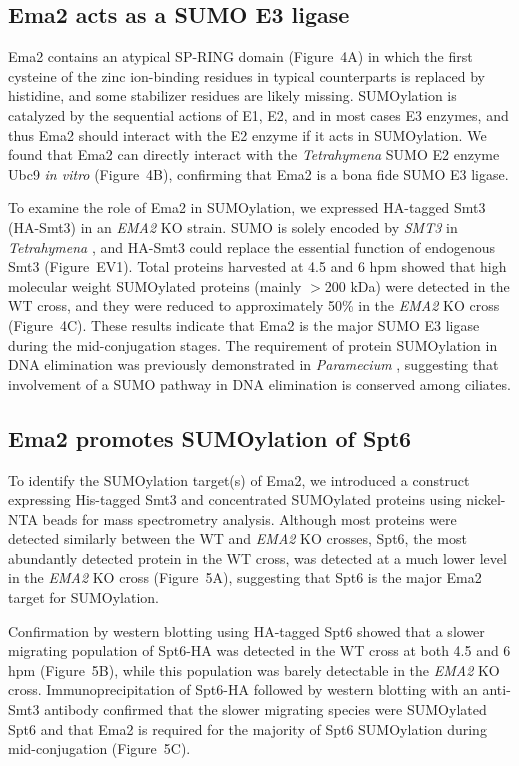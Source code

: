 \documentclass[11pt]{article}
\begin{document}
\subsection{Ema2 acts as a SUMO E3 ligase}

Ema2 contains an atypical SP-RING domain (Figure~4A) in which the first cysteine of the zinc ion-binding residues in typical counterparts is replaced by histidine, and some stabilizer residues \citep{duan2009,yunus2009} are likely missing. SUMOylation is catalyzed by the sequential actions of E1, E2, and in most cases E3 enzymes, and thus Ema2 should interact with the E2 enzyme if it acts in SUMOylation. We found that Ema2 can directly interact with the \textit{Tetrahymena} SUMO E2 enzyme Ubc9 \textit{in vitro} (Figure~4B), confirming that Ema2 is a bona fide SUMO E3 ligase.

To examine the role of Ema2 in SUMOylation, we expressed HA-tagged Smt3 (HA-Smt3) in an \textit{EMA2} KO strain. SUMO is solely encoded by \textit{SMT3} in \textit{Tetrahymena} \citep{nasir2015}, and HA-Smt3 could replace the essential function of endogenous Smt3 (Figure~EV1). Total proteins harvested at 4.5 and 6 hpm showed that high molecular weight SUMOylated proteins (mainly $>$200 kDa) were detected in the WT cross, and they were reduced to approximately 50\% in the \textit{EMA2} KO cross (Figure~4C). These results indicate that Ema2 is the major SUMO E3 ligase during the mid-conjugation stages. The requirement of protein SUMOylation in DNA elimination was previously demonstrated in \textit{Paramecium} \citep{matsuda2006}, suggesting that involvement of a SUMO pathway in DNA elimination is conserved among ciliates.

\subsection{Ema2 promotes SUMOylation of Spt6}

To identify the SUMOylation target(s) of Ema2, we introduced a construct expressing His-tagged Smt3 and concentrated SUMOylated proteins using nickel-NTA beads for mass spectrometry analysis. Although most proteins were detected similarly between the WT and \textit{EMA2} KO crosses, Spt6, the most abundantly detected protein in the WT cross, was detected at a much lower level in the \textit{EMA2} KO cross (Figure~5A), suggesting that Spt6 is the major Ema2 target for SUMOylation.

Confirmation by western blotting using HA-tagged Spt6 showed that a slower migrating population of Spt6-HA was detected in the WT cross at both 4.5 and 6 hpm (Figure~5B), while this population was barely detectable in the \textit{EMA2} KO cross. Immunoprecipitation of Spt6-HA followed by western blotting with an anti-Smt3 antibody confirmed that the slower migrating species were SUMOylated Spt6 and that Ema2 is required for the majority of Spt6 SUMOylation during mid-conjugation (Figure~5C).
\end{document}
